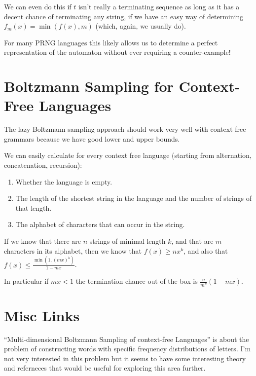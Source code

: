 We can even do this if \(t\) isn't really a terminating sequence as long as it has a decent chance of terminating any string,
if we have an easy way of determining \(f_m(x) = \min(f(x), m)\) (which, again, we usually do).

For many PRNG languages this likely allows us to determine a perfect representation of the automaton without ever requiring a counter-example!

\section{Boltzmann Sampling for Context-Free Languages}

The lazy Boltzmann sampling approach should work very well with context free grammars because we have good lower and upper bounds.

We can easily calculate for every context free language (starting from alternation, concatenation, recursion):

\begin{enumerate}
\item Whether the language is empty.
\item The length of the shortest string in the language and the number of strings of that length.
\item The alphabet of characters that can occur in the string.
\end{enumerate}

If we know that there are \(n\) strings of minimal length \(k\),
and that are \(m\) characters in its alphabet,
then we know that \(f(x) \geq n x^k\),
and also that \(f(x) \leq \frac{\min(1, {(mx)}^k)}{1 - m x}\).

In particular if \(mx < 1\) the termination chance out of the box is \(\frac{n}{m^k} (1 - mx)\).

\section{Misc Links}

``Multi-dimensional Boltzmann Sampling of context-free Languages''\cite{DBLP:journals/corr/abs-1002-0046} is about the problem of constructing words with specific frequency distributions of letters.
I'm not very interested in this problem but it seems to have some interesting theory and referneces that would be useful for exploring this area further.
